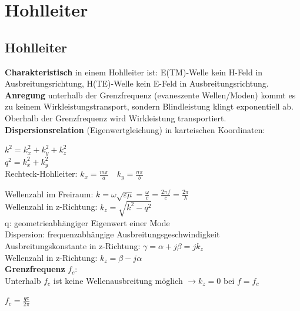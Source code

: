 \documentclass[english]{latex4ei/latex4ei_sheet}
\begin{document}
\section{Hohlleiter}
\begin{sectionbox}
    \subsection{Hohlleiter}
    \textbf{Charakteristisch} in einem Hohlleiter ist:
    E(TM)-Welle kein H-Feld in Ausbreitungsrichtung, H(TE)-Welle kein E-Feld in Ausbreitungsrichtung.\\
    \textbf{Anregung} unterhalb der Grenzfrequenz (evaneszente Wellen/Moden) kommt es zu keinem Wirkleistungstransport, sondern Blindleistung klingt exponentiell ab.
    Oberhalb der Grenzfrequenz wird Wirkleistung transportiert.\\
    \textbf{Dispersionsrelation} (Eigenwertgleichung) in karteischen Koordinaten:
    \begin{emphbox}
        $k^{2}=k_{x}^{2}+k_{y}^{2}+k_{z}^{2}$\\
        $q^2 = k_{x}^{2}+k_{y}^{2}$\\
        Rechteck-Hohlleiter: $k_x = \frac{m\pi}{a}\quad k_y = \frac{n \pi}{b}$
    \end{emphbox}
    Wellenzahl im Freiraum: $k = \omega\sqrt{\varepsilon \mu} = \frac{\omega}{c} = \frac{2\pi f}{c} = \frac{2\pi}{\lambda}$\\
    Wellenzahl in z-Richtung: $k_z = \sqrt{k^2 - q^2}$\\
    q: geometrieabhängiger Eigenwert einer Mode\\
    Dispersion: frequenzabhängige Ausbreitungsgeschwindigkeit\\

    Ausbreitungskonstante in z-Richtung: $\gamma = \alpha + j\beta = jk_z$\\
    Wellenzahl in z-Richtung: $ k_z = \beta - j \alpha$\\

    \textbf{Grenzfrequenz} $f_c$:\\
    Unterhalb $f_c$ ist keine Wellenausbreitung möglich $\rightarrow k_z = 0$ bei $f = f_c$
    \begin{emphbox}
        $f_c = \frac{qc}{2\pi}$
    \end{emphbox}
\end{sectionbox}
\end{document}
